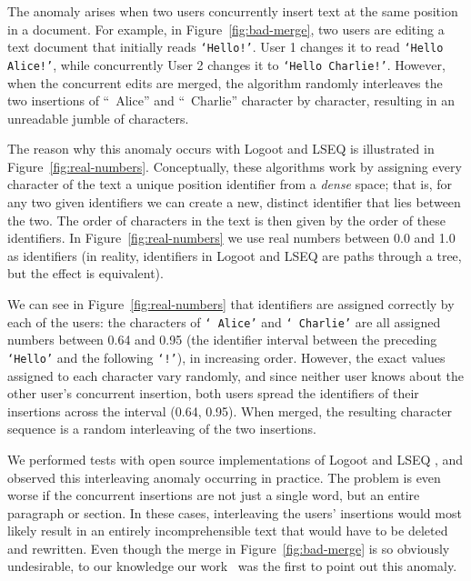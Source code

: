 \documentclass[sigconf]{acmart}
\begin{document}
The anomaly arises when two users concurrently insert text at the same position in a document.
For example, in Figure~\ref{fig:bad-merge}, two users are editing a text document that initially reads \texttt{`Hello!'}.
User 1 changes it to read \texttt{`Hello Alice!'}, while concurrently User 2 changes it to \texttt{`Hello Charlie!'}.
However, when the concurrent edits are merged, the algorithm randomly interleaves the two insertions of ``~Alice'' and ``~Charlie'' character by character, resulting in an unreadable jumble of characters.

The reason why this anomaly occurs with Logoot and LSEQ is illustrated in Figure~\ref{fig:real-numbers}.
Conceptually, these algorithms work by assigning every character of the text a unique position identifier from a \emph{dense} space; that is, for any two given identifiers we can create a new, distinct identifier that lies between the two.
The order of characters in the text is then given by the order of these identifiers.
In Figure~\ref{fig:real-numbers} we use real numbers between 0.0 and 1.0 as identifiers (in reality, identifiers in Logoot and LSEQ are paths through a tree, but the effect is equivalent).

We can see in Figure~\ref{fig:real-numbers} that identifiers are assigned correctly by each of the users: the characters of \texttt{` Alice'} and \texttt{` Charlie'} are all assigned numbers between 0.64 and 0.95 (the identifier interval between the preceding \texttt{`Hello'} and the following \texttt{`!'}), in increasing order.
However, the exact values assigned to each character vary randomly, and since neither user knows about the other user's concurrent insertion, both users spread the identifiers of their insertions across the interval (0.64, 0.95).
When merged, the resulting character sequence is a random interleaving of the two insertions.

We performed tests with open source implementations of Logoot \cite{AhmedNacer:2011ke,ReplicationBenchmark} and LSEQ \cite{LSEQTree,Nedelec:2016eo}, and observed this interleaving anomaly occurring in practice.
The problem is even worse if the concurrent insertions are not just a single word, but an entire paragraph or section.
In these cases, interleaving the users' insertions would most likely result in an entirely incomprehensible text that would have to be deleted and rewritten.
Even though the merge in Figure~\ref{fig:bad-merge} is so obviously undesirable, to our knowledge our work~\cite{ExtendedVersion} was the first to point out this anomaly.
\end{document}
